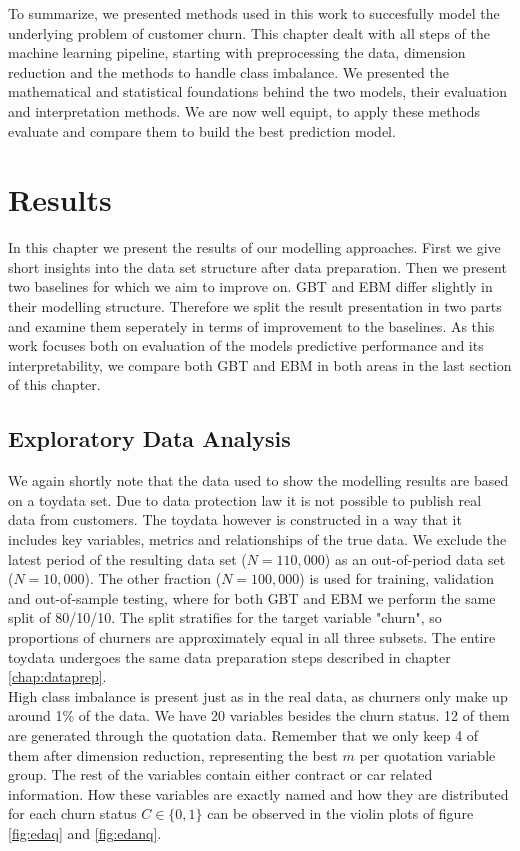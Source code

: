 \documentclass[12pt,titlepage]{article}
\begin{document}
To summarize, we presented methods used in this work to succesfully model the underlying problem of customer churn. This chapter dealt with all steps of the machine learning pipeline, starting with preprocessing the data, dimension reduction and the methods to handle class imbalance. We presented the mathematical and statistical foundations behind the two models, their evaluation and interpretation methods. We are now well equipt, to apply these methods evaluate and compare them to build the best prediction model. \\

\section{Results} \par

In this chapter we present the results of our modelling approaches. First we give short insights into the data set structure after data preparation. Then we present two baselines for which we aim to improve on. GBT and EBM differ slightly in their modelling structure. Therefore we split the result presentation in two parts and examine them seperately in terms of improvement to the baselines. As this work focuses both on evaluation of the models predictive performance and its interpretability, we compare both GBT and EBM in both areas in the last section of this chapter. \\

\subsection{Exploratory Data Analysis} \par

We again shortly note that the data used to show the modelling results are based on a toydata set. Due to data protection law it is not possible to publish real data from customers. The toydata however is constructed in a way that it includes key variables, metrics and relationships of the true data. We exclude the latest period of the resulting data set ($N=110,000$) as an out-of-period data set ($N=10,000$). The other fraction ($N=100,000$) is used for training, validation and out-of-sample testing, where for both GBT and EBM we perform the same split of 80/10/10. The split stratifies for the target variable "churn", so proportions of churners are approximately equal in all three subsets. The entire toydata undergoes the same data preparation steps described in chapter \ref{chap:dataprep}. \\
High class imbalance is present just as in the real data, as churners only make up around 1\% of the data. We have 20 variables besides the churn status. 12 of them are generated through the quotation data. Remember that we only keep 4 of them after dimension reduction, representing the best $m$ per quotation variable group. The rest of the variables contain either contract or car related information. How these variables are exactly named and how they are distributed for each churn status $C\in \{0,1\}$ can be observed in the violin plots of figure \ref{fig:edaq} and \ref{fig:edanq}. \\
\noindent
\end{document}
